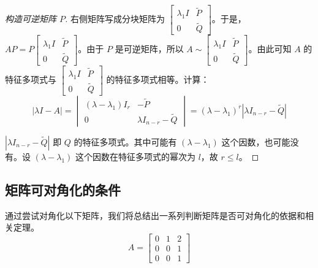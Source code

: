 \begin{proof}[构造可逆矩阵 $P$]
	右侧矩阵写成分块矩阵为 $\begin{bmatrix} \lambda_1 I & \tilde P \\ 0 & \tilde Q \end{bmatrix}$。于是，$AP = P \begin{bmatrix} \lambda_1 I & \tilde P \\ 0 & \tilde Q \end{bmatrix}$。由于 $P$ 是可逆矩阵，所以 $A \sim \begin{bmatrix} \lambda_1 I & \tilde P \\ 0 & \tilde Q \end{bmatrix}$。由此可知 $A$ 的特征多项式与 $\begin{bmatrix} \lambda_1 I & \tilde P \\ 0 & \tilde Q \end{bmatrix}$ 的特征多项式相等。计算：
	$$
	|\lambda I - A| =
	\begin{vmatrix}
	(\lambda - \lambda_1) I_{r} & - \tilde P
	\\
	0 & \lambda I_{n - r} - \tilde Q
	\end{vmatrix}
	=
	(\lambda - \lambda_1)^{r} |\lambda I_{n - r} - \tilde Q|
	$$

	$|\lambda I_{n - r} - \tilde Q|$ 即 $Q$ 的特征多项式。其中可能有 $(\lambda - \lambda_1)$ 这个因数，也可能没有。设 $(\lambda - \lambda_1)$ 这个因数在特征多项式的幂次为 $l$，故 $r \le l$。
\end{proof}

\subsection{矩阵可对角化的条件}

通过尝试对角化以下矩阵，我们将总结出一系列判断矩阵是否可对角化的依据和相关定理。
$$
A = \begin{bmatrix} 0 & 1 & 2 \\ 0 & 0 & 1 \\ 0 & 0 & 1 \end{bmatrix}
$$


